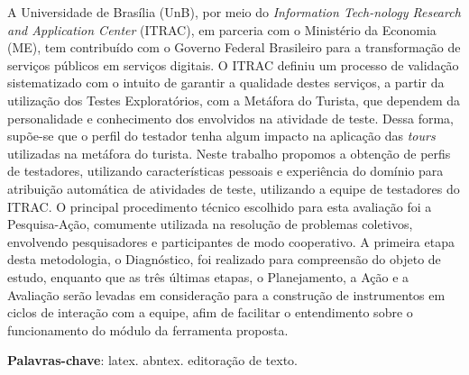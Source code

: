 \begin{resumo}

A Universidade de Brasília (UnB), por meio do \textit{Information Tech-nology Research and Application Center} (ITRAC), em parceria com o Ministério da Economia (ME), tem contribuído com o Governo Federal Brasileiro para a transformação de serviços públicos em serviços digitais. O ITRAC definiu um processo de validação sistematizado com o intuito de garantir a qualidade destes serviços, a partir da utilização dos Testes Exploratórios, com a Metáfora do Turista, que dependem da personalidade e conhecimento dos envolvidos na atividade de teste. Dessa forma, supõe-se que o perfil do testador tenha algum impacto na aplicação das \textit{tours} utilizadas na metáfora do turista. Neste trabalho propomos a obtenção de perfis de testadores, utilizando características pessoais e experiência do domínio para atribuição automática de atividades de teste, utilizando a equipe de testadores do ITRAC. O principal procedimento técnico escolhido para esta avaliação foi a Pesquisa-Ação, comumente utilizada na resolução de problemas coletivos, envolvendo pesquisadores e participantes de modo cooperativo. A primeira etapa desta metodologia, o Diagnóstico, foi realizado para compreensão do objeto de estudo, enquanto que as três últimas etapas, o Planejamento, a Ação e a Avaliação serão levadas em consideração para a construção de instrumentos em ciclos de interação com a equipe, afim de facilitar o entendimento sobre o funcionamento do módulo da ferramenta proposta.

 \vspace{\onelineskip}
    
 \noindent
 \textbf{Palavras-chave}: latex. abntex. editoração de texto.
\end{resumo}
    